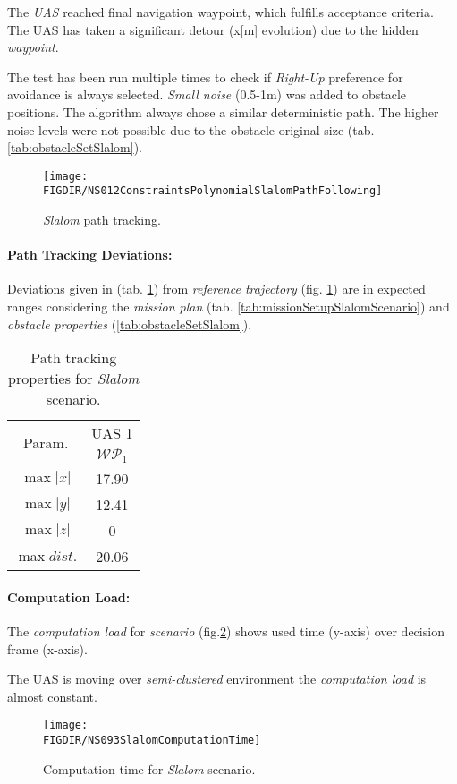 The \emph{UAS} reached final navigation waypoint, which fulfills acceptance criteria. The UAS has taken a significant detour (x[m] evolution) due to the hidden \emph{waypoint}. 

The test has been run multiple times to check if \emph{Right-Up} preference for avoidance is always selected. \emph{Small noise} (0.5-1m) was added to obstacle positions. The algorithm always chose a similar deterministic path. The higher noise levels were not possible due to the obstacle original size (tab. \ref{tab:obstacleSetSlalom}).

\begin{figure}[H]
    \centering
    \texttt{[image: \\FIGDIR/NS012ConstraintsPolynomialSlalomPathFollowing]} 
    \caption{\emph{Slalom} path tracking.}
    \label{fig:testCaseSlalomPathTracking}
\end{figure}


\paragraph{Path Tracking Deviations:} Deviations given in (tab. \ref{tab:pathTrackingParametersForSlalomAvoidance}) from \emph{reference trajectory} (fig. \ref{fig:testCaseSlalomPathTracking}) are in expected ranges considering the \emph{mission plan} (tab. \ref{tab:missionSetupSlalomScenario}) and \emph{obstacle properties} (\ref{tab:obstacleSetSlalom}).

\begin{table}[H]
    \centering
    \begin{tabular}{c||c}
        \multirow{2}{*}{Param.} & UAS 1\\\cline{2-2}
                        & $\mathscr{WP}_1$  \\\hline\hline
          $\max |x|$    & 17.90      \\\hline
          $\max |y|$    & 12.41    \\\hline
          $\max |z|$    & 0        \\\hline
          $\max dist.$  & 20.06   \\
    \end{tabular}
    \caption{Path tracking properties for \emph{Slalom} scenario.}
    \label{tab:pathTrackingParametersForSlalomAvoidance}
\end{table}

\paragraph{Computation Load:} The \emph{computation load} for \emph{scenario} (fig.\ref{fig:slalomComputationTime}) shows used time (y-axis) over decision frame (x-axis).

The UAS is moving over \emph{semi-clustered} environment the \emph{computation load} is almost constant.

\begin{figure}[H]
    \centering
    \texttt{[image: \\FIGDIR/NS093SlalomComputationTime]} 
    \caption{Computation time for \emph{Slalom} scenario.}
    \label{fig:slalomComputationTime}
\end{figure}
